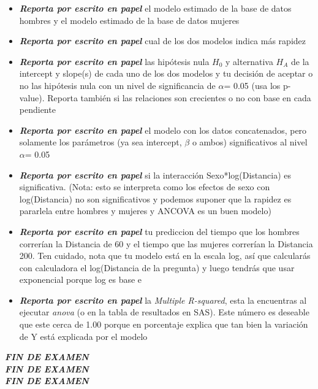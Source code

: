 \documentclass[letterpaper,11pt]{article}
\begin{document}
\begin{itemize}
\item \textbf{\textit{Reporta por escrito en papel}} el modelo estimado de la base de datos hombres y el 
modelo estimado de la base de datos mujeres

\item \textbf{\textit{Reporta por escrito en papel}} cual de los dos modelos indica m\'as rapidez

\item \textbf{\textit{Reporta por escrito en papel}} las hip\'otesis nula $H_{0}$ y alternativa $H_{A}$ de 
la intercept y slope(s) de cada uno de los dos modelos y tu decisi\'on de aceptar o no las hip\'otesis nula con un nivel de 
significancia de $\alpha$= 0.05 (usa los p-value). Reporta tambi\'en si las relaciones son crecientes o no 
con base en cada pendiente

\item \textbf{\textit{Reporta por escrito en papel}} el modelo con los datos concatenados, pero
solamente los par\'ametros (ya sea intercept, $\beta$ o ambos) significativos al nivel $\alpha$= 0.05

\item \textbf{\textit{Reporta por escrito en papel}} si la interacci\'on Sexo*log(Distancia) es significativa.
(Nota: esto se interpreta como los efectos de sexo con log(Distancia) no son significativos y podemos 
suponer que la rapidez es pararlela entre hombres y mujeres y ANCOVA es un buen modelo)

\item \textbf{\textit{Reporta por escrito en papel}} tu prediccion del tiempo que los hombres correr\'ian la Distancia de 60
y el tiempo que las mujeres correr\'ian la Distancia 200. Ten cuidado, nota que tu modelo est\'a en la escala log,
as\'i que calcular\'as con calculadora el log(Distancia de la pregunta) y luego tendr\'as que usar exponencial
porque log es base e

\item \textbf{\textit{Reporta por escrito en papel}} la \textit{Multiple R-squared}, esta la encuentras al 
ejecutar \textit{anova} (o en la tabla de resultados en SAS). Este n\'umero es deseable que este cerca de 1.00 porque en porcentaje explica 
que tan bien la variaci\'on de Y est\'a explicada por el modelo
\end{itemize}

\textit{\textbf{FIN DE EXAMEN}} \\
\textit{\textbf{FIN DE EXAMEN}} \\
\textit{\textbf{FIN DE EXAMEN}} \\
\end{document}
